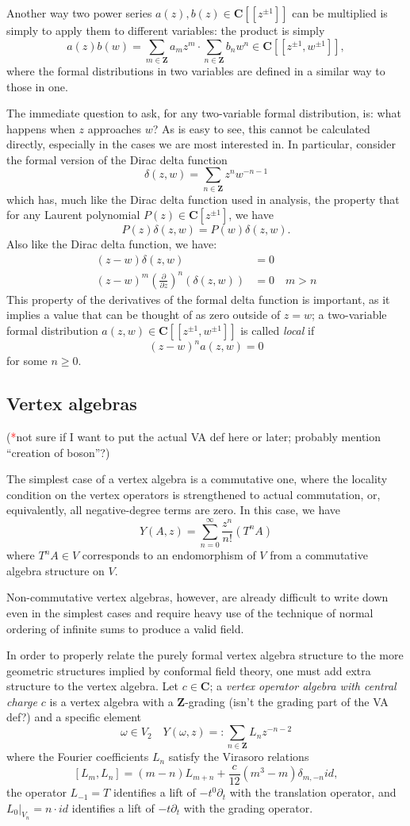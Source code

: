 \documentclass{article}
\newcommand{\CC}{\mathbold{C}}
\newcommand{\ZZ}{\mathbold{Z}}
\newcommand{\tk}{\textcolor{red}{*}}
\begin{document}
Another way two power series $a(z),b(z) \in \CC[[z^{\pm 1}]]$ can be multiplied is simply to apply them to different variables: the product is simply
\[a(z)b(w)=\sum_{m \in \ZZ}a_mz^m \cdot \sum_{n \in \ZZ}b_nw^n \in \CC[[z^{\pm 1},w^{\pm 1}]], \]
where the formal distributions in two variables are defined in a similar way to those in one.

The immediate question to ask, for any two-variable formal distribution, is: what happens when $z$ approaches $w$?  As is easy to see, this cannot be calculated directly, especially in the cases we are most interested in.  In particular, consider the formal version of the Dirac delta function
\[\delta(z,w)=\sum_{n \in \ZZ} z^n w^{-n-1} \]
which has, much like the Dirac delta function used in analysis, the property that for any Laurent polynomial $P(z) \in \CC[z^{\pm 1}]$, we have
\[P(z) \delta(z,w) = P(w) \delta(z,w). \]
Also like the Dirac delta function, we have:
\begin{align*}
  (z-w) \delta(z,w) &= 0\\
  (z-w)^m \left(\frac{\partial}{\partial z} \right)^n (\delta(z,w))&=0 \quad m>n
\end{align*}
This property of the derivatives of the formal delta function is important, as it implies a value that can be thought of as zero outside of $z=w$; a two-variable formal distribution $a(z,w) \in \CC[[z^{\pm 1},w^{\pm 1}]]$ is called \textit{local} if
\[(z-w)^n a(z,w)=0 \]
for some $n \ge 0$.

\subsection{Vertex algebras}

(\tk not sure if I want to put the actual VA def here or later; probably mention ``creation of boson''?)

The simplest case of a vertex algebra is a commutative one, where the locality condition on the vertex operators is strengthened to actual commutation, or, equivalently, all negative-degree terms are zero.  In this case, we have
\[Y(A,z)=\sum_{n=0}^{\infty} \frac{z^n}{n!}(T^nA) \]
where $T^nA \in V$ corresponds to an endomorphism of $V$ from a commutative algebra structure on $V$.

Non-commutative vertex algebras, however, are already difficult to write down even in the simplest cases and require heavy use of the technique of normal ordering of infinite sums to produce a valid field.

In order to properly relate the purely formal vertex algebra structure to the more geometric structures implied by conformal field theory, one must add extra structure to the vertex algebra.  Let $c \in \CC$; a \textit{vertex operator algebra with central charge $c$} is a vertex algebra with a $\ZZ$-grading (isn't the grading part of the VA def?) and a specific element
\[\omega \in V_2 \quad Y(\omega,z) =: \sum_{n \in \ZZ} L_n z^{-n-2} \]
where the Fourier coefficients $L_n$ satisfy the Virasoro relations
\[[L_m,L_n]=(m-n)L_{m+n}+\frac{c}{12}(m^3-m)\delta_{m,-n} id, \]
the operator $L_{-1}=T$ identifies a lift of $-t^0\partial_t$ with the translation operator, and $L_0|_{V_n}=n \cdot id$ identifies a lift of $-t\partial_t$ with the grading operator.
\end{document}
